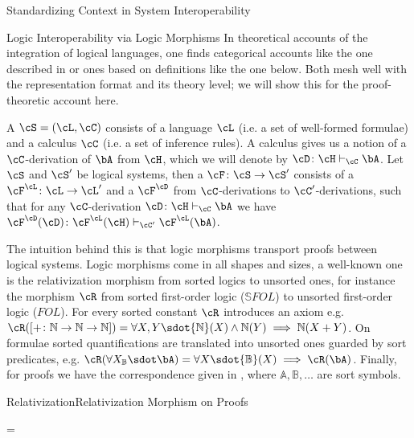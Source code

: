 \begin{omgroup}[id=logics,creators=miko]{Standardizing Context in System Interoperability}
\begin{omgroup}[id=logic.morphisms]{Logic Interoperability via Logic Morphisms}
  In theoretical accounts of the integration of logical languages, one finds categorical
  accounts like the one described in {} or {}
  ones based on definitions like the one below. Both mesh well with the {\omdoc}
  representation format and its theory level; we will show this for the proof-theoretic
  account here.

\begin{definition}[id=logical-system.def]
  A {} $\cS=(\cL,\cC)$ consists of a language $\cL$ (i.e. a set of
  well-formed formulae) and a calculus $\cC$ (i.e. a set of inference rules).  A calculus
  gives us a notion of a $\cC$-derivation of $\bA$ from $\cH$, which we will denote by
  $\cD\colon\cH\vdash_\cC\bA$. Let $\cS$ and $\cS'$ be logical systems, then a
  {} $\cF\colon\cS\to\cS'$ consists of a {} $\cF^\cL\colon\cL\to\cL'$ and a {} $\cF^\cD$
  from $\cC$-derivations to $\cC'$-derivations, such that for any $\cC$-derivation
  $\cD\colon\cH\vdash_\cC\bA$ we have $\cF^\cD(\cD)\colon
  \cF^\cL(\cH)\vdash_{\cC'}\cF^\cL(\bA)$.
\end{definition}
\def\sortn{{\mathbb N}}\def\sortb{{\mathbb B}}\def\sorta{{\mathbb A}} \def\sortc{{\mathbb
    C}}\def\ofsort{\colon} The intuition behind this is that logic morphisms transport
proofs between logical systems. Logic morphisms come in all shapes and sizes, a well-known
one is the relativization morphism from sorted logics to unsorted ones, for instance the
morphism $\cR$ from sorted first-order logic (${\mathbb S} FOL$) to unsorted first-order
logic ($FOL$). For every sorted constant $\cR$ introduces an axiom
e.g. $\cR([+\colon\sortn\rightarrow\sortn\rightarrow\sortn])= \forall
X,Y\sdot\sortn(X)\land\sortn(Y)\implies\sortn(X+Y)$. On formulae sorted quantifications
are translated into unsorted ones guarded by sort predicates, e.g.  $\cR(\forall
X_\sortb\sdot\bA)=\forall X\sdot\sortb(X)\implies\cR(\bA)$. Finally, for proofs we have
the correspondence given in {}, where $\sorta,\sortb,\ldots$ are
sort symbols.
\begin{myfig}{Relativization}{Relativization Morphism on Proofs}\vspace*{-.5cm}
  \begin{textnd}
    =\hbox{\ibnc{\bA\ofsort\sortb\rightarrow\sortc}
                        {\bB\ofsort\sortb}
}
\end{textnd}
\end{myfig}
\end{omgroup}
\end{omgroup}
